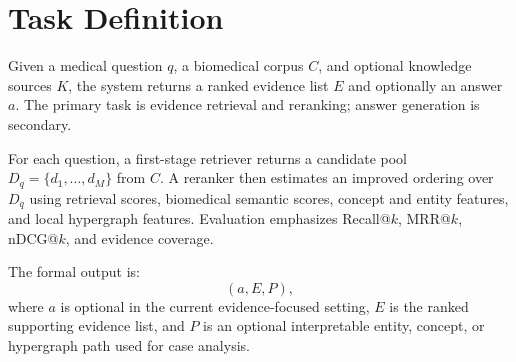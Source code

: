 \section{Task Definition}

Given a medical question $q$, a biomedical corpus $C$, and optional knowledge sources $K$, the system returns a ranked evidence list $E$ and optionally an answer $a$. The primary task is evidence retrieval and reranking; answer generation is secondary.

For each question, a first-stage retriever returns a candidate pool $D_q = \{d_1,\ldots,d_M\}$ from $C$. A reranker then estimates an improved ordering over $D_q$ using retrieval scores, biomedical semantic scores, concept and entity features, and local hypergraph features. Evaluation emphasizes Recall@$k$, MRR@$k$, nDCG@$k$, and evidence coverage.

The formal output is:
\[
  (a, E, P),
\]
where $a$ is optional in the current evidence-focused setting, $E$ is the ranked supporting evidence list, and $P$ is an optional interpretable entity, concept, or hypergraph path used for case analysis.

